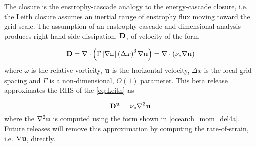 The \cite{Leith:1996wu} closure is the enstrophy-cascade analogy to the \cite{Smagorinsky:1963wc} energy-cascade closure, i.e.  the Leith closure assumes an inertial range of enstrophy flux moving toward the grid scale. The assumption of an enstrophy cascade and dimensional analysis produces right-hand-side dissipation, $\bf{D}$, of velocity of the form

\begin{equation}
\label{eq:Leith}
{\bf D} = \nabla \cdot \left( \Gamma \left| \nabla \omega  \right| \left( \Delta x \right)^3 \nabla \bf{u} \right)=\nabla \cdot \left( \nu_\ast \nabla {\bf u} \right)
\end{equation}
where $\omega$ is the relative vorticity, ${\bf u}$ is the horizontal velocity, $\Delta x$ is the local grid spacing and $\Gamma$ is a non-dimensional, $O(1)$ parameter. This beta release approximates the RHS of the \ref{eq:Leith} as

\begin{equation}
\bf{D^u}=\nu_\ast \nabla^2 {\bf u}
\end{equation}
where the $\nabla^2 {\bf u}$ is computed using the form shown in \ref{ocean:h_mom_del4a}. Future releases will remove this approximation by computing the rate-of-strain, i.e. $\nabla {\bf u}$, directly.
